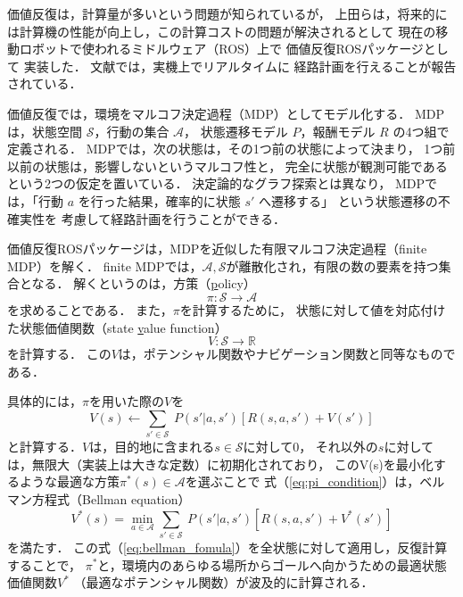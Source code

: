 価値反復は，計算量が多いという問題が知られているが，
上田らは，将来的には計算機の性能が向上し，この計算コストの問題が解決されるとして
現在の移動ロボットで使われるミドルウェア（ROS）上で
価値反復ROSパッケージとして
実装した\cite{Ueda2023jrm, 上田vi, 上田vi2}．
文献\cite{Ueda2023jrm}では，実機上でリアルタイムに
経路計画を行えることが報告されている．

価値反復では，環境をマルコフ決定過程（MDP）としてモデル化する．
MDPは，状態空間 $\mathcal{S}$，行動の集合 $\mathcal{A}$，
状態遷移モデル $P$，報酬モデル $R$ 
の4つ組で定義される\cite{中居2022, 上田2019詳解}．
MDPでは，次の状態は，その1つ前の状態によって決まり，
1つ前以前の状態は，影響しないというマルコフ性と，
完全に状態が観測可能であるという2つの仮定を置いている．
決定論的なグラフ探索とは異なり，
MDPでは，「行動 $a$ を行った結果，確率的に状態 $s'$ へ遷移する」
という状態遷移の不確実性を
考慮して経路計画を行うことができる．


価値反復ROSパッケージは，MDPを近似した有限マルコフ決定過程（finite MDP）を解く\cite{上田2019詳解}．
finite MDPでは，$\mathcal{A}, \mathcal{S}$が離散化され，有限の数の要素を持つ集合となる．
解くというのは，方策（\underline{p}olicy）
\begin{equation}
    \pi : \mathcal{S} \to \mathcal{A} 
    \label{eq:define_pi}
\end{equation}
を求めることである．
また，$\pi$を計算するために，
状態に対して値を対応付けた状態価値関数（state \underline{v}alue function）
\begin{equation}
    V : \mathcal{S} \to \mathbb{R}
    \label{eq:define_v}
\end{equation}
を計算する．
この$V$は，ポテンシャル関数やナビゲーション関数と同等なものである．

具体的には，$\pi$を用いた際の$V$を
\begin{equation}
    V(s) \leftarrow \sum_{s' \in \mathcal{S}} \
	P(s'|a, s') \left[ R(s, a, s') + V(s') \right]
    \label{eq:pi_condition}
\end{equation}
と計算する．$V$は，目的地に含まれる$s \in \mathcal{S}$に対して0，
それ以外の$s$に対しては，無限大（実装上は大きな定数）に初期化されており，
このV(s)を最小化するような最適な方策$\pi^*(s) \in \mathcal{A}$を選ぶことで
式（\ref{eq:pi_condition}）は，ベルマン方程式（Bellman equation）
\begin{equation}
    V^*(s) = \min_{a \in \mathcal{A}} \sum_{s' \in \mathcal{S}} \
	P(s'|a, s') \left[ R(s, a, s') + V^*(s') \right]
    \label{eq:bellman_fomula}
\end{equation}
を満たす．
この式（\ref{eq:bellman_fomula}）を全状態に対して適用し，反復計算することで，
$\pi^*$と，環境内のあらゆる場所からゴールへ向かうための最適状態価値関数$V^*$
（最適なポテンシャル関数）が波及的に計算される．

